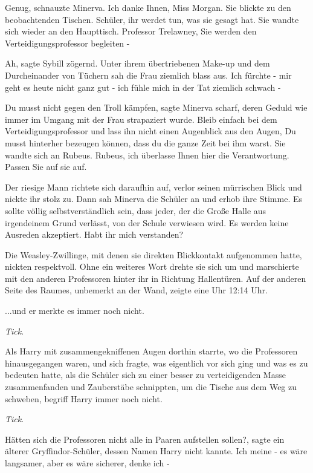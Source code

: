 \glqq Genug\grqq{}, schnauzte Minerva. \glqq Ich danke Ihnen, Miss
Morgan.\grqq{} Sie blickte zu den beobachtenden Tischen. \glqq Schüler, ihr
werdet tun, was sie gesagt hat.\grqq{} Sie wandte sich wieder an den Haupttisch.
\glqq Professor Trelawney, Sie werden den Verteidigungsprofessor begleiten
-\grqq{}

\glqq Ah\grqq{}, sagte Sybill zögernd. Unter ihrem übertriebenen Make-up und dem
Durcheinander von Tüchern sah die Frau ziemlich blass aus. \glqq Ich fürchte -
mir geht es heute nicht ganz gut - ich fühle mich in der Tat ziemlich schwach
-\grqq{}

\glqq Du musst nicht gegen den Troll kämpfen\grqq{}, sagte Minerva scharf, deren
Geduld wie immer im Umgang mit der Frau strapaziert wurde. \glqq Bleib einfach
bei dem Verteidigungsprofessor und lass ihn nicht einen Augenblick aus den
Augen, Du musst hinterher bezeugen können, dass du die ganze Zeit bei ihm
warst.\grqq{} Sie wandte sich an Rubeus. \glqq Rubeus, ich überlasse Ihnen hier
die Verantwortung. Passen Sie auf sie auf.\grqq{}

Der riesige Mann richtete sich daraufhin auf, verlor seinen mürrischen Blick und
nickte ihr stolz zu. Dann sah Minerva die Schüler an und erhob ihre Stimme.
\glqq Es sollte völlig selbstverständlich sein, dass jeder, der die Große Halle
aus irgendeinem Grund verlässt, von der Schule verwiesen wird. Es werden keine
Ausreden akzeptiert. Habt ihr mich verstanden?\grqq{}

Die Weasley-Zwillinge, mit denen sie direkten Blickkontakt aufgenommen hatte,
nickten respektvoll. Ohne ein weiteres Wort drehte sie sich um und marschierte
mit den anderen Professoren hinter ihr in Richtung Hallentüren. Auf der anderen
Seite des Raumes, unbemerkt an der Wand, zeigte eine Uhr 12:14 Uhr.

...und er merkte es immer noch nicht.

\emph{Tick}.

Als Harry mit zusammengekniffenen Augen dorthin starrte, wo die Professoren
hinausgegangen waren, und sich fragte, was eigentlich vor sich ging und was es
zu bedeuten hatte, als die Schüler sich zu einer besser zu verteidigenden Masse
zusammenfanden und Zauberstäbe schnippten, um die Tische aus dem Weg zu
schweben, begriff Harry immer noch nicht.

\emph{Tick}.

\glqq Hätten sich die Professoren nicht alle in Paaren aufstellen
sollen?\grqq{}, sagte ein älterer Gryffindor-Schüler, dessen Namen Harry nicht
kannte. \glqq Ich meine - es wäre langsamer, aber es wäre sicherer, denke ich
-\grqq{}

